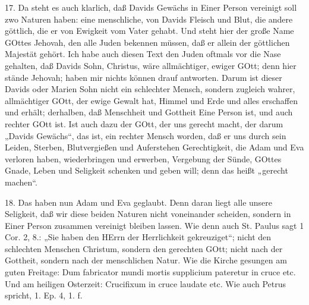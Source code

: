 17. Da steht es auch klarlich, daß Davids Gewächs in Einer Person vereinigt soll zwo Naturen haben: eine menschliche, von Davids Fleisch und Blut, die andere göttlich, die er von Ewigkeit vom Vater gehabt. Und steht hier der große Name GOttes Jehovah, den alle Juden bekennen müssen, daß er allein der göttlichen Majestät gehört. Ich habe auch diesen Text den Juden oftmals vor die Nase gehalten, daß Davids Sohn, Christus, wäre allmächtiger, ewiger GOtt; denn hier stände Jehovah; haben mir nichts können drauf antworten. Darum ist dieser Davids oder Marien Sohn nicht ein schlechter Mensch, sondern zugleich wahrer, allmächtiger GOtt, der ewige Gewalt hat, Himmel und Erde und alles erschaffen und erhält; derhalben, daß Menschheit und Gottheit Eine Person ist, und auch rechter GOtt ist. Ist auch dazu der GOtt, der uns gerecht macht, der darum „Davids Gewächs“, das ist, ein rechter Mensch worden, daß er uns durch sein Leiden, Sterben, Blutvergießen und Auferstehen Gerechtigkeit, die Adam und Eva verloren haben, wiederbringen und erwerben, Vergebung der Sünde, GOttes Gnade, Leben und Seligkeit schenken und geben will; denn das heißt „gerecht machen“.

18. Das haben nun Adam und Eva geglaubt. Denn daran liegt alle unsere Seligkeit, daß wir diese beiden Naturen nicht voneinander scheiden, sondern in Einer Person zusammen vereinigt bleiben lassen. Wie denn auch St. Paulus sagt 1 Cor. 2, 8.: „Sie haben den HErrn der Herrlichkeit gekreuziget“; nicht den schlechten Menschen Christum, sondern den gerechten GOtt; nicht nach der Gottheit, sondern nach der menschlichen Natur. Wie die Kirche gesungen am guten Freitage: Dum fabricator mundi mortis supplicium pateretur in cruce etc. Und am heiligen Osterzeit: Crucifixum in cruce laudate etc. Wie auch Petrus spricht, 1. Ep. 4, 1. f.

